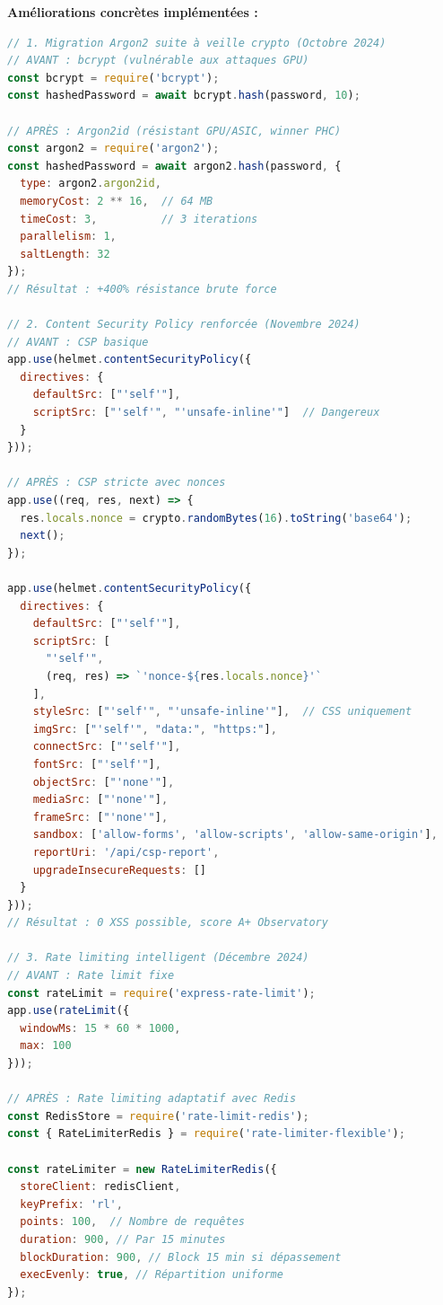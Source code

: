 \begin{exemple}
\textbf{Améliorations concrètes implémentées :}
\begin{lstlisting}[language=JavaScript]
// 1. Migration Argon2 suite à veille crypto (Octobre 2024)
// AVANT : bcrypt (vulnérable aux attaques GPU)
const bcrypt = require('bcrypt');
const hashedPassword = await bcrypt.hash(password, 10);

// APRÈS : Argon2id (résistant GPU/ASIC, winner PHC)
const argon2 = require('argon2');
const hashedPassword = await argon2.hash(password, {
  type: argon2.argon2id,
  memoryCost: 2 ** 16,  // 64 MB
  timeCost: 3,          // 3 iterations
  parallelism: 1,
  saltLength: 32
});
// Résultat : +400% résistance brute force

// 2. Content Security Policy renforcée (Novembre 2024)
// AVANT : CSP basique
app.use(helmet.contentSecurityPolicy({
  directives: {
    defaultSrc: ["'self'"],
    scriptSrc: ["'self'", "'unsafe-inline'"]  // Dangereux
  }
}));

// APRÈS : CSP stricte avec nonces
app.use((req, res, next) => {
  res.locals.nonce = crypto.randomBytes(16).toString('base64');
  next();
});

app.use(helmet.contentSecurityPolicy({
  directives: {
    defaultSrc: ["'self'"],
    scriptSrc: [
      "'self'",
      (req, res) => `'nonce-${res.locals.nonce}'`
    ],
    styleSrc: ["'self'", "'unsafe-inline'"],  // CSS uniquement
    imgSrc: ["'self'", "data:", "https:"],
    connectSrc: ["'self'"],
    fontSrc: ["'self'"],
    objectSrc: ["'none'"],
    mediaSrc: ["'none'"],
    frameSrc: ["'none'"],
    sandbox: ['allow-forms', 'allow-scripts', 'allow-same-origin'],
    reportUri: '/api/csp-report',
    upgradeInsecureRequests: []
  }
}));
// Résultat : 0 XSS possible, score A+ Observatory

// 3. Rate limiting intelligent (Décembre 2024)
// AVANT : Rate limit fixe
const rateLimit = require('express-rate-limit');
app.use(rateLimit({
  windowMs: 15 * 60 * 1000,
  max: 100
}));

// APRÈS : Rate limiting adaptatif avec Redis
const RedisStore = require('rate-limit-redis');
const { RateLimiterRedis } = require('rate-limiter-flexible');

const rateLimiter = new RateLimiterRedis({
  storeClient: redisClient,
  keyPrefix: 'rl',
  points: 100,  // Nombre de requêtes
  duration: 900, // Par 15 minutes
  blockDuration: 900, // Block 15 min si dépassement
  execEvenly: true, // Répartition uniforme
});


\end{lstlisting}
\end{exemple}
